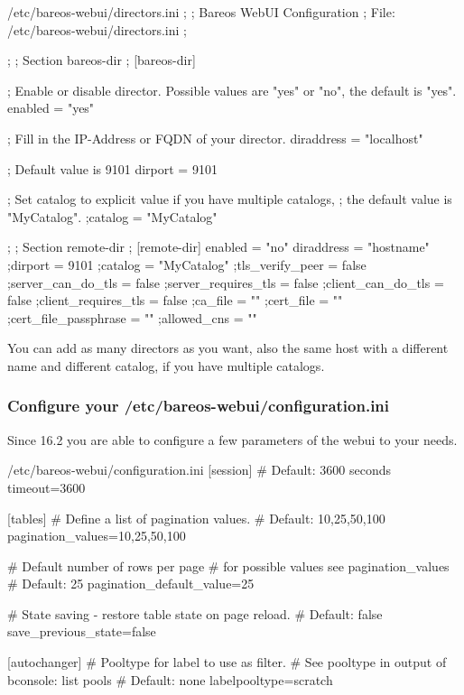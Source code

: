 \begin{bconfig}{/etc/bareos-webui/directors.ini}
;
; Bareos WebUI Configuration
; File: /etc/bareos-webui/directors.ini
;

;
; Section bareos-dir
;
[bareos-dir]

; Enable or disable director. Possible values are "yes" or "no", the default is "yes".
enabled = "yes"

; Fill in the IP-Address or FQDN of your director.
diraddress = "localhost"

; Default value is 9101
dirport = 9101

; Set catalog to explicit value if you have multiple catalogs,
; the default value is "MyCatalog".
;catalog = "MyCatalog"

;
; Section remote-dir
;
[remote-dir]
enabled = "no"
diraddress = "hostname"
;dirport = 9101
;catalog = "MyCatalog"
;tls_verify_peer = false
;server_can_do_tls = false
;server_requires_tls = false
;client_can_do_tls = false
;client_requires_tls = false
;ca_file = ""
;cert_file = ""
;cert_file_passphrase = ""
;allowed_cns = ""
\end{bconfig}

You can add as many directors as you want, also the same host with a different name and different catalog, if you have multiple catalogs.

\subsubsection{Configure your /etc/bareos-webui/configuration.ini}

Since 16.2 you are able to configure a few parameters of the webui to your needs.

\begin{bconfig}{/etc/bareos-webui/configuration.ini}
[session]
# Default: 3600 seconds
timeout=3600

[tables]
# Define a list of pagination values.
# Default: 10,25,50,100
pagination_values=10,25,50,100

# Default number of rows per page
# for possible values see pagination_values
# Default: 25
pagination_default_value=25

# State saving - restore table state on page reload.
# Default: false
save_previous_state=false

[autochanger]
# Pooltype for label to use as filter.
# See pooltype in output of bconsole: list pools
# Default: none
labelpooltype=scratch
\end{bconfig}

